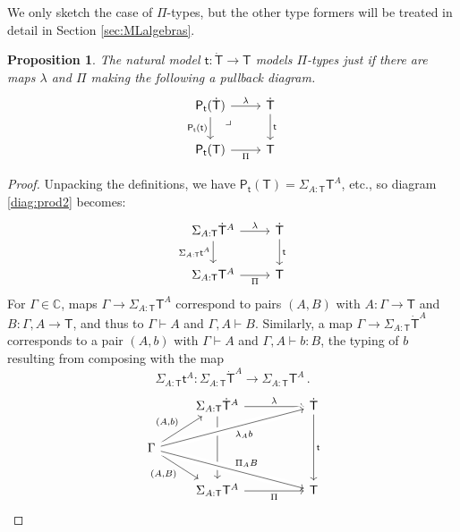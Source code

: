 \documentclass[12pt,reqno]{amsart}
\newcommand{\C}{\ensuremath{\mathbb{C}}}
\newcommand{\alg}[1]{\ensuremath{\mathsf{#1}}}
\renewcommand{\to}{\ensuremath{\rightarrow}}
\newcommand{\G}{\ensuremath{\Gamma}}
\newcommand{\ext}[2]{{#1,#2}}
\renewcommand{\t}{\ensuremath{\mathsf{t}}}
\newcommand{\tT}{\ensuremath{{\t}:\TT\to\T}}
\newcommand{\T}{\ensuremath{\mathsf{T}}}
\newcommand{\TT}{\ensuremath{\dot{\mathsf{T}}}}
\newcommand{\pbcorner}{\arrow[dr,phantom,"\lrcorner" very near start, shift right=.5ex]} %
\newtheorem{proposition}[theorem]{Proposition}
\theoremstyle{remark}
\theoremstyle{definition}
\begin{document}
We only sketch the case of $\Pi$-types, but the other type formers will be treated in detail in Section \ref{sec:MLalgebras}.

\begin{proposition}  The natural model $\tT$ models $\Pi$-types just if there are maps $\lambda$ and $\Pi$ making the following a pullback diagram. 
\begin{equation}\label{diag:prod2}
\begin{tikzcd}
\alg{P}_\t(\TT)  \ar[d,swap, "{\alg{P}_\t(\t)}"]   \ar[r, "\lambda"]  \pbcorner &  \TT \ar[d, "{\t}"]\\
\alg{P}_\t(\T)	\ar[r,swap, "{\Pi}"] & \T
\end{tikzcd}
\end{equation}
\end{proposition}
%
\begin{proof}
Unpacking the definitions, we have $\alg{P}_\t(\T) = \Sigma_{A:\T} \T^A $, etc.,  
so diagram \eqref{diag:prod2} becomes:
\begin{equation*}%
\begin{tikzcd}
\Sigma_{A:\T} \TT^A \ar[d,swap, "{\Sigma_{A:\T} \t^A}"]  \ar[r, "{\lambda}"] &  \TT \ar[d,"{\t}"] \\
\Sigma_{A:\T} \T^A    \ar[r, swap,"{\Pi}"] & \T
\end{tikzcd}
\end{equation*}
For $\G \in \C$, maps $\G\to \Sigma_{A:\T} \T^A $ correspond to pairs $(A,B)$ with  $A:\G\to \T$ and $B : \ext{\G}{A} \to \T$, and thus to $\G\vdash A$ and $\ext{\G}{A} \vdash B$. Similarly, a map $\G\to \Sigma_{A:\T} \TT^A $ corresponds to a pair $(A,b)$ with $\G\vdash A$ and $\ext{\G}{A} \vdash b : B$, the typing of $b$ resulting from composing with the map 
\[
\Sigma_{A:\T} \t^A : \Sigma_{A:\T} \TT^A \to \Sigma_{A:\T} \T^A\,.
\]
\begin{equation*}%
\begin{tikzcd}
	& \Sigma_{A:\T} \TT^A \ar[dd]  \ar[rr, "{\lambda}"] &&  \TT \ar[dd,"{\t}"] \\
\G \ar[dr,swap, "{(A,B)}"] \ar[ru, "{(A,b)}"] \ar[urrr, swap, crossing over, "{ \lambda_{A}b }"] \ar[drrr, crossing over, "{ \Pi_{A}B }"] &&& \\
 	& \Sigma_{A:\T}\T^A    \ar[rr, swap,"{\Pi}"] && \T 

\end{tikzcd}
\end{equation*}
\end{proof}
\end{document}
